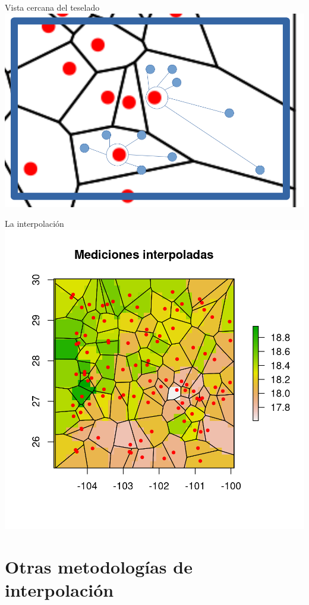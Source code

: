 \documentclass[
  11pt,
  ignorenonframetext,
]{beamer}
\begin{document}
\begin{frame}{Vista cercana del teselado}
\protect\hypertarget{vista-cercana-del-teselado-2}{}
\includegraphics{Interpolacion/Voronoi-cerca-2.png}
\end{frame}

\begin{frame}{La interpolación}
\protect\hypertarget{la-interpolaciuxf3n}{}
\includegraphics{Interpolacion/Ngb-1.png}
\end{frame}

\hypertarget{otras-metodologuxedas-de-interpolaciuxf3n}{%
\section{Otras metodologías de
interpolación}\label{otras-metodologuxedas-de-interpolaciuxf3n}}
\end{document}
